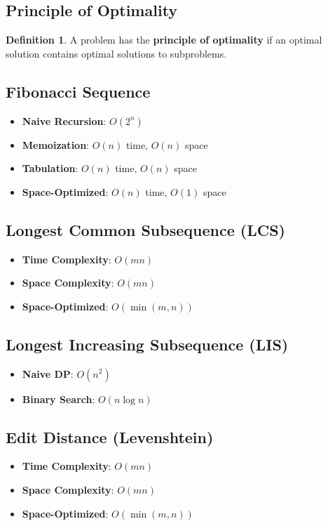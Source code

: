\documentclass[11pt]{article}
\theoremstyle{definition}
\newtheorem{definition}{Definition}[section]
\begin{document}
\subsection{Principle of Optimality}
\begin{definition}
A problem has the \textbf{principle of optimality} if an optimal solution contains optimal solutions to subproblems.
\end{definition}

\subsection{Fibonacci Sequence}
\begin{itemize}
    \item \textbf{Naive Recursion}: $O(2^n)$
    \item \textbf{Memoization}: $O(n)$ time, $O(n)$ space
    \item \textbf{Tabulation}: $O(n)$ time, $O(n)$ space
    \item \textbf{Space-Optimized}: $O(n)$ time, $O(1)$ space
\end{itemize}

\subsection{Longest Common Subsequence (LCS)}
\begin{itemize}
    \item \textbf{Time Complexity}: $O(mn)$
    \item \textbf{Space Complexity}: $O(mn)$
    \item \textbf{Space-Optimized}: $O(\min(m,n))$
\end{itemize}

\subsection{Longest Increasing Subsequence (LIS)}
\begin{itemize}
    \item \textbf{Naive DP}: $O(n^2)$
    \item \textbf{Binary Search}: $O(n \log n)$
\end{itemize}

\subsection{Edit Distance (Levenshtein)}
\begin{itemize}
    \item \textbf{Time Complexity}: $O(mn)$
    \item \textbf{Space Complexity}: $O(mn)$
    \item \textbf{Space-Optimized}: $O(\min(m,n))$
\end{itemize}
\end{document}
